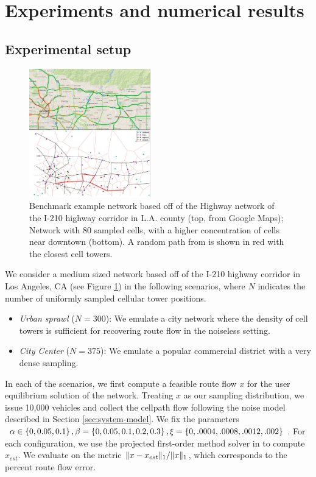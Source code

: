 
\section{Experiments and numerical results}

\subsection{Experimental setup}
\begin{figure}[h!]
  \centering
    \includegraphics[width=0.47\textwidth]{figures/small_map_half.jpeg}
  \caption{\footnotesize{Benchmark example network based off of the Highway network of the I-210 highway corridor in L.A. county (top, from Google Maps); Network with 80 sampled cells, with a higher concentration of cells near downtown (bottom). A random path from is shown in red with the closest cell towers.}}
  \label{fig:small-network}
\end{figure}

We consider a medium sized network based off of the I-210 highway corridor in Los Angeles, CA (see Figure \ref{fig:small-network}) in the following scenarios, where $N$ indicates the number of uniformly sampled cellular tower positions. 
\begin{itemize}
\item \textit{Urban sprawl} ($N=300$): We emulate a city network where the density of cell towers is sufficient for recovering route flow in the noiseless setting.
\item \textit{City Center} ($N=375$): We emulate a popular commercial district with a very dense sampling.
\end{itemize}
In each of the scenarios, we first compute a feasible route flow $x$ for the user equilibrium solution of the network. Treating $x$ as our sampling distribution, we issue 10,000 vehicles and collect the cellpath flow following the noise model described in Section \ref{sec:system-model}. We fix the parameters $\alpha\in\left\{ 0,0.05,0.1 \right\}, \beta=\left\{ 0, 0.05, 0.1, 0.2, 0.3 \right\},\xi=\left\{ 0, .0004, .0008, .0012, .002 \right\}$. For each configuration, we use the projected first-order method solver in \cite{Wu2015} to compute $x_{est}$. We evaluate on the metric $\lVert x-x_{est}\rVert_1/\lVert x\rVert_1$, which corresponds to the percent route flow error.

